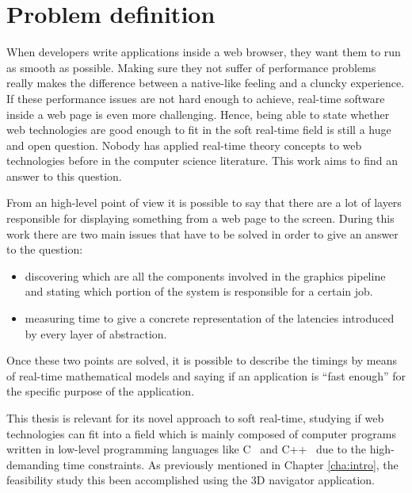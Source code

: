\chapter{Problem definition} \label{cha:problem_definition}

When developers write applications inside a web browser, they want them to run
as smooth as possible. Making sure they not suffer of performance problems really
makes the difference between a native-like feeling and a cluncky experience.
If these performance issues are not hard enough to achieve, real-time software
inside a web page is even more challenging. Hence, being able to state whether
web technologies are good enough to fit in the soft real-time field is still a
huge and open question. Nobody has applied real-time theory concepts to web
technologies before in the computer science literature. This work aims to find
an answer to this question.

From an high-level point of view it is possible to say that there are a lot of
layers responsible for displaying something from a web page to the screen.
During this work there are two main issues that have to be solved in order to
give an answer to the question:
\begin{itemize}
    \item discovering which are all the components involved in the graphics
        pipeline and stating which portion of the system is responsible for a
        certain job.
    \item measuring time to give a concrete representation of the latencies
        introduced by every layer of abstraction.
\end{itemize}

Once these two points are solved, it is possible to describe the timings by means
of real-time mathematical models and saying if an application is ``fast enough''
for the specific purpose of the application.

This thesis is relevant for its novel approach to soft real-time, studying
if web technologies can fit into a field which is mainly composed of computer
programs written in low-level programming languages like C~\cite{kernighan2006c}
and C++~\cite{stroustrup1995c++} due to the high-demanding time constraints.
As previously mentioned in Chapter \ref{cha:intro}, the feasibility study this
been accomplished using the 3D navigator application.
